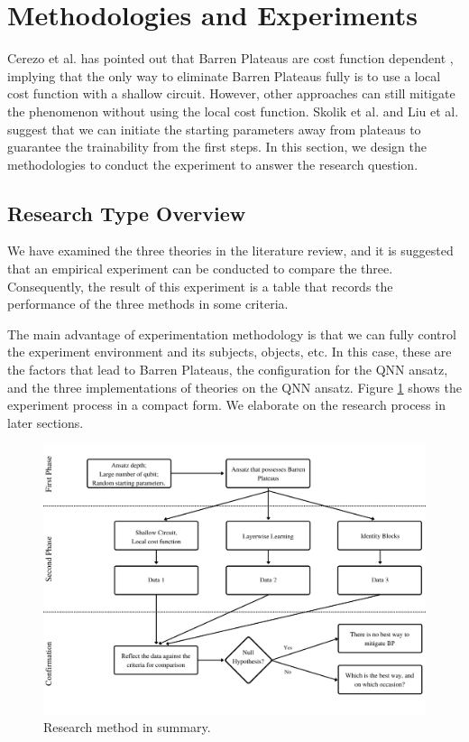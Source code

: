 \section{Methodologies and Experiments}
Cerezo et al. has pointed out that Barren Plateaus are cost function dependent \cite{cerezoCostFunctionDependent2021}, implying that the only way to eliminate Barren Plateaus fully is to use a local cost function with a shallow circuit.
However, other approaches can still mitigate the phenomenon without using the local cost function.
Skolik et al. and Liu et al. \cite{skolikLayerwiseLearningQuantum2021, liuParameterInitializationMethod2021} suggest that we can initiate the starting parameters away from plateaus to guarantee the trainability from the first steps.
In this section, we design the methodologies to conduct the experiment to answer the research question.

\subsection{Research Type Overview}
We have examined the three theories \cite{cerezoCostFunctionDependent2021, liuParameterInitializationMethod2021, skolikLayerwiseLearningQuantum2021} in the literature review, and it is suggested that an empirical experiment can be conducted to compare the three.
Consequently, the result of this experiment is a table that records the performance of the three methods in some criteria.

The main advantage of experimentation methodology is that we can fully control the experiment environment and its subjects, objects, etc.
In this case, these are the factors that lead to Barren Plateaus, the configuration for the QNN ansatz, and the three implementations of theories on the QNN ansatz.
Figure \ref{Research Activities} shows the experiment process in a compact form.
We elaborate on the research process in later sections.

\begin{figure}
    \centering
    \includegraphics[width=\textwidth]{./ResearchDesign/Appendices/Method.png}
    \caption{
        Research method in summary.
    }
    \label{Research Activities}
\end{figure}

